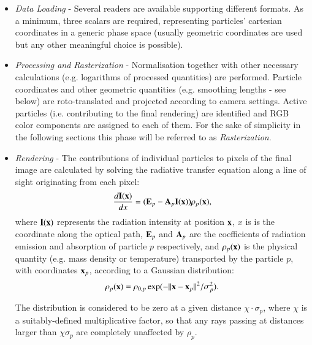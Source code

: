 \documentclass[1p]{elsarticle}
\begin{document}
\begin{itemize}
\item
{\it Data Loading} - Several readers are available supporting different formats. As a minimum, three scalars are required, representing particles' cartesian coordinates in a generic phase space (usually geometric coordinates are used but any other meaningful choice is possible).
\item
{\it Processing and Rasterization} - Normalisation together with other necessary 
calculations (e.g. logarithms of processed quantities) are performed. Particle
coordinates and other geometric quantities (e.g. smoothing lengths - see below) are
roto-translated and projected according to camera settings.
Active particles (i.e. contributing to the final rendering) are identified and RGB color components are assigned to each of them.
For the sake of simplicity in the following sections 
this phase will be referred to as {\it Rasterization}.
\item
{\it Rendering} - The contributions of individual particles to pixels of the final 
image are calculated by solving the radiative transfer equation  \cite{1991par..book.....S} along a line of sight originating from each pixel:
\begin{equation}\label{rad}
\frac{d{\bf I}{(\bf x})}{dx}=({\bf E}_p-{\bf A}_p{\bf I}({\bf x}))\rho_p({\bf x}),
\end{equation}
where ${\bf I}({\bf x})$ represents the radiation intensity at position ${\bf x}$, $x$ is is the coordinate along the optical path,  ${\bf E}_p$ and ${\bf A}_p$ are the coefficients of radiation emission and absorption of particle $p$ respectively, and $\rho_p({\bf x})$ is the physical quantity (e.g. mass density or temperature) transported by the particle $p$, with coordinates ${\bf x}_p$, according to a Gaussian distribution:
\begin{equation}\label{kernel}
\rho_p({\bf x}) = \rho_{0,p}\exp(-{||{\bf x}-{\bf x}_p||}^2/\sigma_p^2).
\end{equation}
 
The distribution is considered to be zero at a given distance $\chi\cdot\sigma_p$, where $\chi$ is a suitably-defined multiplicative factor, so that any rays passing at distances larger than $\chi\sigma_p$ are completely unaffected by $\rho_p$.


\end{itemize}
\end{document}

